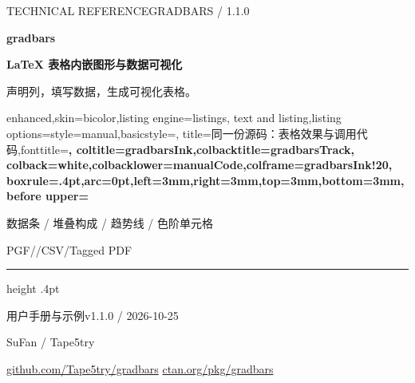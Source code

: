 \begingroup
\setlength{\parindent}{0pt}
\setlength{\parskip}{4pt}
\thispagestyle{empty}
{\small\sffamily\color{gradbarsTeal}TECHNICAL REFERENCE\hfill GRADBARS / 1.1.0}\par
\vspace{8mm}
{\fontsize{50}{54}\selectfont\sffamily\bfseries\color{gradbarsInk}gradbars}\par
\vspace{3mm}
{\Large\bfseries\color{gradbarsInk}\LaTeX{} 表格内嵌图形与数据可视化}\par
\vspace{3mm}
{\large\color{black!55}声明列，填写数据，生成可视化表格。}\par
\vspace{7mm}
\begin{tcblisting}{enhanced,skin=bicolor,listing engine=listings,
  text and listing,listing options={style=manual,basicstyle=\gradbarscodefont\fontsize{8}{10}\selectfont},
  title={同一份源码：表格效果与调用代码},fonttitle=\small\bfseries,
  coltitle=gradbarsInk,colbacktitle=gradbarsTrack,
  colback=white,colbacklower=manualCode,colframe=gradbarsInk!20,
  boxrule=.4pt,arc=0pt,left=3mm,right=3mm,top=3mm,bottom=3mm,
  before upper={\small\setlength{\parindent}{0pt}}}
\begin{center}
\begin{gradtable}[align=c,header align=c,width=\linewidth,column sep=4pt,row stretch=1.5,label width=7mm]
\end{gradtable}
\end{center}
\end{tcblisting}
\vspace{3mm}
{\small\sffamily\color{gradbarsTeal}数据条 / 堆叠构成 / 趋势线 / 色阶单元格}\par
{\small\color{black!55}PGF/\manualTikZ{}\quad /\quad CSV\quad /\quad Tagged PDF}\par
\vfill
{\color{gradbarsInk!20}\hrule height .4pt}
\vspace{4mm}
{\small\sffamily\color{gradbarsInk}用户手册与示例\hfill v1.1.0 / 2026-10-25}\par
{\small\sffamily SuFan / Tape5try}\par
{\footnotesize\href{https://github.com/Tape5try/gradbars}{github.com/Tape5try/gradbars}
\hfill\href{https://ctan.org/pkg/gradbars}{ctan.org/pkg/gradbars}}\par
\endgroup

